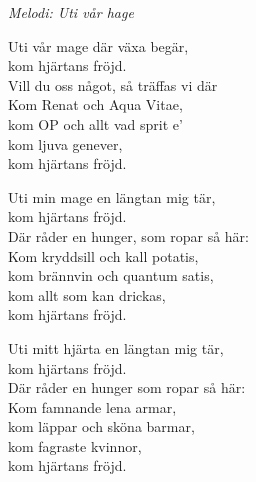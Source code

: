 {\footnotesize\textit{Melodi: Uti vår hage}}\par
\vspace{10pt}
Uti vår mage där växa begär,\\
kom hjärtans fröjd.\\
Vill du oss något, så träffas vi där\\
Kom Renat och Aqua Vitae,\\
kom OP och allt vad sprit e'\\
kom ljuva genever,\\
kom hjärtans fröjd.\par
\vspace{10pt}
Uti min mage en längtan mig tär,\\
kom hjärtans fröjd.\\
Där råder en hunger, som ropar så här:\\
Kom kryddsill och kall potatis,\\
kom brännvin och quantum satis,\\
kom allt som kan drickas,\\
kom hjärtans fröjd.\par
\vspace{10pt}
Uti mitt hjärta en längtan mig tär,\\
kom hjärtans fröjd.\\
Där råder en hunger som ropar så här:\\
Kom famnande lena armar,\\
kom läppar och sköna barmar,\\
kom fagraste kvinnor,\\
kom hjärtans fröjd.
